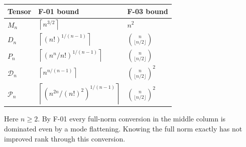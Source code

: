\documentclass[11pt]{article}
\newcommand{\ceil}[1]{\left\lceil#1\right\rceil}
\begin{document}
\begin{center}\small
\begin{tabular}{lll}\toprule
Tensor & F-01 bound & F-03 bound\\\midrule
$M_n$ & $\ceil{n^{3/2}}$ & $n^2$\\
$D_n$ & $\ceil{(n!)^{1/(n-1)}}$ & $\binom n{\lfloor n/2\rfloor}$\\
$P_n$ & $\ceil{(n^n/n!)^{1/(n-1)}}$ & $\binom n{\lfloor n/2\rfloor}$\\
$\mathcal D_n$ & $\ceil{n^{n/(n-1)}}$ & $\binom n{\lfloor n/2\rfloor}^2$\\
$\mathcal P_n$ & $\ceil{(n^{2n}/(n!)^2)^{1/(n-1)}}$
 & $\binom n{\lfloor n/2\rfloor}^2$\\\bottomrule
\end{tabular}
\end{center}
Here $n\geq2$. By F-01 every full-norm conversion in the middle
column is dominated even by a mode flattening. Knowing the full
norm exactly has not improved rank through this conversion.
\end{document}
